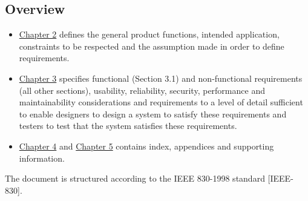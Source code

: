 \begin{reference_table}
\end{reference_table}


\subsection{Overview}
\label{intro:overview} %
\begin{itemize}
	\item \hyperref[description]{Chapter 2} defines the general product functions, intended application, constraints to be respected and
	the assumption made in order to define requirements.
	\item \hyperref[requirements]{Chapter 3} specifies functional (Section 3.1) and non-functional requirements (all other sections),
	usability, reliability, security, performance and maintainability considerations and requirements to a
	level of detail sufficient to enable designers to design a system to satisfy these requirements and
	testers to test that the system satisfies these requirements.
	\item \hyperref[appendix]{Chapter 4} and \hyperref[index]{Chapter 5} contains index, appendices and supporting information.
\end{itemize}
The document is structured according to the IEEE 830-1998 standard [IEEE-830].
